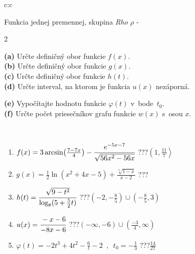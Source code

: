 \documentclass[10pt]{report}
\begin{document}
\begin{tabular}{c:c}
\begin{minipage}[c][104.5mm][t]{0.5\linewidth}
\begin{center}
\vspace{7mm}
{\huge Funkcia jednej premennej, skupina \textit{Rho $\rho$} -}\\[5mm]
\begin{minipage}{0.95\linewidth}
\begin{center}
{\small \begin{multicols}{2} \raggedright
\textbf{(a)} Určte definičný obor funkcie \(f(x)\). \\[1mm]
\textbf{(b)} Určte definičný obor funkcie \(g(x)\). \\[1mm]
\textbf{(c)} Určte definičný obor funkcie \(h(t)\). \\[1mm]
\textbf{(d)} Určte interval, na ktorom je funkcia \(u(x)\) nezáporná. \par \columnbreak
\textbf{(e)} Vypočítajte hodnotu funkcie \(\varphi(t)\) v~bode~\(t_0\). \\[1mm]
\textbf{(f)} Určte počet priesečníkov grafu funkcie \(w(x)\) s~osou \(x\). \\[1mm]
\end{multicols}
}
\end{center}
\end{minipage}
\\[4mm]
\begin{minipage}{0.79\linewidth}
\begin{center}
\begin{varwidth}{\linewidth}
\begin{enumerate}
\small
\item $f(x) = 3\arcsin\!\left( \frac{7-7x}{4} \right) - \cfrac{e^{-5x-7}}{\sqrt{56x^2-56x}}$\quad \dotfill\; ???\;\dotfill \quad $\left(1 , \frac{11}{7}\right\rangle$
\item $g(x) = \frac{1}{2} \ln{\!(x^2+4x-5)}+\frac{\sqrt[3]{1-x}}{x-2}$\quad \dotfill\; ???\;\dotfill {}
\item $h(t) = \cfrac{\sqrt{9-t^2}}{\log_8(5+\frac{5}{2}t)}$\quad \dotfill\; ???\;\dotfill \quad $\left(-2 , -\frac{8}{5}\right)\cup\left(-\frac{8}{5} , 3\right)$
\item $u(x) = \cfrac{-x-6}{-8x-6}$\quad \dotfill\; ???\;\dotfill \quad $\left(-\infty , -6\right)\cup\left(\frac{-3}{4} , \infty\right)$
\item $\varphi(t) = -2t^3+4t^2-\frac{6}{t}-2 \enspace , \enspace t_0=-\frac{1}{3}$\quad \dotfill\; ???\;\dotfill \quad $\frac{14}{27}$

\end{enumerate}
\end{varwidth}
\end{center}
\end{minipage}
\end{center}
\end{minipage}
\end{tabular}
\end{document}
